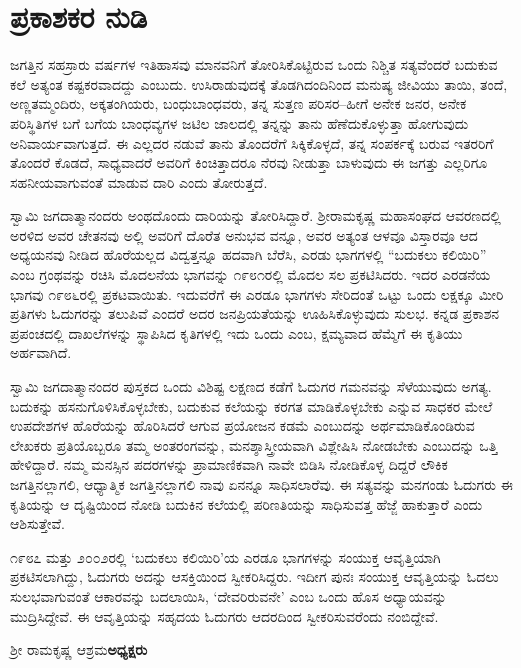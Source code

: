 
\chapter{ಪ್ರಕಾಶಕರ ನುಡಿ}

ಜಗತ್ತಿನ ಸಹಸ್ರಾರು ವರ್ಷಗಳ ಇತಿಹಾಸವು ಮಾನವನಿಗೆ ತೋರಿಸಿಕೊಟ್ಟಿರುವ ಒಂದು ನಿಶ್ಚಿತ ಸತ್ಯವೆಂದರೆ ಬದುಕುವ ಕಲೆ ಅತ್ಯಂತ ಕಷ್ಟಕರವಾದದ್ದು ಎಂಬುದು. ಉಸಿರಾಡುವುದಕ್ಕೆ ತೊಡಗಿದಂದಿನಿಂದ ಮನುಷ್ಯ ಜೀವಿಯು ತಾಯಿ, ತಂದೆ, ಅಣ್ಣತಮ್ಮಂದಿರು, ಅಕ್ಕತಂಗಿಯರು, ಬಂಧುಬಾಂಧವರು, ತನ್ನ ಸುತ್ತಣ ಪರಿಸರ–ಹೀಗೆ ಅನೇಕ ಜನರ, ಅನೇಕ ಪರಿಸ್ಥಿತಿಗಳ ಬಗೆ ಬಗೆಯ ಬಾಂಧವ್ಯಗಳ ಜಟಿಲ ಜಾಲದಲ್ಲಿ ತನ್ನನ್ನು ತಾನು ಹೆಣೆದುಕೊಳ್ಳುತ್ತಾ ಹೋಗುವುದು ಅನಿವಾರ್ಯವಾಗುತ್ತದೆ. ಈ ಎಲ್ಲದರ ನಡುವೆ ತಾನು ತೊಂದರೆಗೆ ಸಿಕ್ಕಿಕೊಳ್ಳದೆ, ತನ್ನ ಸಂಪರ್ಕಕ್ಕೆ ಬರುವ ಇತರರಿಗೆ ತೊಂದರೆ ಕೊಡದೆ, ಸಾಧ್ಯವಾದರೆ ಅವರಿಗೆ ಕಿಂಚಿತ್ತಾದರೂ ನೆರವು ನೀಡುತ್ತಾ ಬಾಳುವುದು ಈ ಜಗತ್ತು ಎಲ್ಲರಿಗೂ ಸಹನೀಯವಾಗುವಂತೆ ಮಾಡುವ ದಾರಿ ಎಂದು ತೋರುತ್ತದೆ.

ಸ್ವಾಮಿ ಜಗದಾತ್ಮಾನಂದರು ಅಂಥದೊಂದು ದಾರಿಯನ್ನು ತೋರಿಸಿದ್ದಾರೆ. ಶ‍್ರೀರಾಮಕೃಷ್ಣ ಮಹಾಸಂಘದ ಆವರಣದಲ್ಲಿ ಅರಳಿದ ಅವರ ಚೇತನವು ಅಲ್ಲಿ ಅವರಿಗೆ ದೊರೆತ ಅನುಭವ ವನ್ನೂ, ಅವರ ಅತ್ಯಂತ ಆಳವೂ ವಿಸ್ತಾರವೂ ಆದ ಅಧ್ಯಯನವು ನೀಡಿದ ಹೊರೆಯಲ್ಲದ ವಿದ್ವತ್ತನ್ನೂ ಹದವಾಗಿ ಬೆರೆಸಿ, ಎರಡು ಭಾಗಗಳಲ್ಲಿ “ಬದುಕಲು ಕಲಿಯಿರಿ” ಎಂಬ ಗ್ರಂಥವನ್ನು ರಚಿಸಿ ಮೊದಲನೆಯ ಭಾಗವನ್ನು ೧೯೮೧ರಲ್ಲಿ ಮೊದಲ ಸಲ ಪ್ರಕಟಿಸಿದರು. ಇದರ ಎರಡನೆಯ ಭಾಗವು ೧೯೮೬ರಲ್ಲಿ ಪ್ರಕಟವಾಯಿತು. ಇದುವರೆಗೆ ಈ ಎರಡೂ ಭಾಗಗಳು ಸೇರಿದಂತೆ ಒಟ್ಟು ಒಂದು ಲಕ್ಷಕ್ಕೂ ಮೀರಿ ಪ್ರತಿಗಳು ಓದುಗರನ್ನು ತಲುಪಿವೆ ಎಂದರೆ ಅದರ ಜನಪ್ರಿಯತೆಯನ್ನು ಊಹಿಸಿಕೊಳ್ಳುವುದು ಸುಲಭ. ಕನ್ನಡ ಪ್ರಕಾಶನ ಪ್ರಪಂಚದಲ್ಲಿ ದಾಖಲೆಗಳನ್ನು ಸ್ಥಾಪಿಸಿದ ಕೃತಿಗಳಲ್ಲಿ ಇದು ಒಂದು ಎಂಬ, ಕ್ಷಮ್ಯವಾದ ಹೆಮ್ಮೆಗೆ ಈ ಕೃತಿಯು ಅರ್ಹವಾಗಿದೆ.

ಸ್ವಾಮಿ ಜಗದಾತ್ಮಾನಂದರ ಪುಸ್ತಕದ ಒಂದು ವಿಶಿಷ್ಟ ಲಕ್ಷಣದ ಕಡೆಗೆ ಓದುಗರ ಗಮನವನ್ನು ಸೆಳೆಯುವುದು ಅಗತ್ಯ. ಬದುಕನ್ನು ಹಸನುಗೊಳಿಸಿಕೊಳ್ಳಬೇಕು, ಬದುಕುವ ಕಲೆಯನ್ನು ಕರಗತ ಮಾಡಿಕೊಳ್ಳಬೇಕು ಎನ್ನುವ ಸಾಧಕರ ಮೇಲೆ ಉಪದೇಶಗಳ ಹೊರೆಯನ್ನು ಹೊರಿಸಿದರೆ ಆಗುವ ಪ್ರಯೋಜನ ಕಡಮೆ ಎಂಬುದನ್ನು ಅರ್ಥಮಾಡಿಕೊಂಡಿರುವ ಲೇಖಕರು ಪ್ರತಿಯೊಬ್ಬರೂ ತಮ್ಮ ಅಂತರಂಗವನ್ನು, ಮನಶ್ಶಾಸ್ತ್ರೀಯವಾಗಿ ವಿಶ್ಲೇಷಿಸಿ ನೋಡಬೇಕು ಎಂಬುದನ್ನು ಒತ್ತಿ ಹೇಳಿದ್ದಾರೆ. ನಮ್ಮ ಮನಸ್ಸಿನ ಪದರಗಳನ್ನು ಪ್ರಾಮಾಣಿಕವಾಗಿ ನಾವೇ ಬಿಡಿಸಿ ನೋಡಿಕೊಳ್ಳ ದಿದ್ದರೆ ಲೌಕಿಕ ಜಗತ್ತಿನಲ್ಲಾಗಲಿ, ಆಧ್ಯಾತ್ಮಿಕ ಜಗತ್ತಿನಲ್ಲಾಗಲಿ ನಾವು ಏನನ್ನೂ ಸಾಧಿಸಲಾರೆವು. ಈ ಸತ್ಯವನ್ನು ಮನಗಂಡು ಓದುಗರು ಈ ಕೃತಿಯನ್ನು ಆ ದೃಷ್ಟಿಯಿಂದ ನೋಡಿ ಬದುಕಿನ ಕಲೆಯಲ್ಲಿ ಪರಿಣತಿಯನ್ನು ಸಾಧಿಸುವತ್ತ ಹೆಜ್ಜೆ ಹಾಕುತ್ತಾರೆ ಎಂದು ಆಶಿಸುತ್ತೇವೆ.

೧೯೮೭ ಮತ್ತು ೨೦೦೨ರಲ್ಲಿ ‘ಬದುಕಲು ಕಲಿಯಿರಿ’ಯ ಎರಡೂ ಭಾಗಗಳನ್ನು ಸಂಯುಕ್ತ ಆವೃತ್ತಿಯಾಗಿ ಪ್ರಕಟಿಸಲಾಗಿದ್ದು, ಓದುಗರು ಅದನ್ನು ಆಸಕ್ತಿಯಿಂದ ಸ್ವೀಕರಿಸಿದ್ದರು. ಇದೀಗ ಪುನಃ ಸಂಯುಕ್ತ ಆವೃತ್ತಿಯನ್ನು ಓದಲು ಸುಲಭವಾಗುವಂತೆ ಆಕಾರವನ್ನು ಬದಲಾಯಿಸಿ, ‘ದೇವರಿರುವನೇ’ ಎಂಬ ಒಂದು ಹೊಸ ಅಧ್ಯಾಯವನ್ನು ಮುದ್ರಿಸಿದ್ದೇವೆ. ಈ ಆವೃತ್ತಿಯನ್ನು ಸಹೃದಯ ಓದುಗರು ಆದರದಿಂದ ಸ್ವೀಕರಿಸುವರೆಂದು ನಂಬಿದ್ದೇವೆ.

\bigskip

\noindent ಶ‍್ರೀ ರಾಮಕೃಷ್ಣ ಆಶ್ರಮ\hfill\textbf{ಅಧ್ಯಕ್ಷರು}

